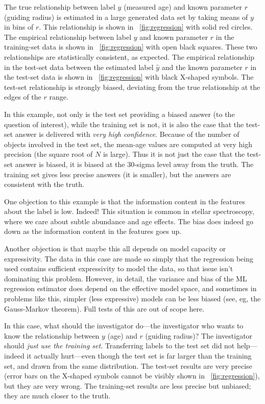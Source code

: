 \documentclass{article}
\newcommand{\figref}[1]{\figurename~\ref{#1}}
\begin{document}
The true relationship between label $y$ (measured age) and known parameter $r$ (guiding radius) is estimated in a large generated data set by taking means of $y$ in bins of $r$.
This relationship is shown in \figref{fig:regression} with solid red circles.
The empirical relationship between label $y$ and known parameter $r$ in the training-set data is shown in \figref{fig:regression} with open black squares.
These two relationships are statistically consistent, as expected.
The empirical relationship in the test-set data between the estimated label $\hat{y}$ and the known parameter $r$ in the test-set data is shown in \figref{fig:regression} with black X-shaped symbols.
The test-set relationship is strongly biased, deviating from the true relationship at the edges of the $r$ range.

In this example, not only is the test set providing a biased answer (to the question of interest), while the training set is not, it is also the case that the test-set answer is delivered with \emph{very high confidence}.
Because of the number of objects involved in the test set, the mean-age values are computed at very high precision (the square root of $N$ is large).
Thus it is not just the case that the test-set answer is biased, it is biased at the 30-sigma level away from the truth.
The training set gives less precise answers (it is smaller), but the answers are consistent with the truth.

One objection to this example is that the information content in the features about the label is low.
Indeed! This situation is common in stellar spectroscopy, where we care about subtle abundance and age effects.
The bias does indeed go down as the information content in the features goes up.

Another objection is that maybe this all depends on model capacity or expressivity.
The data in this case are made so simply that the regression being used contains sufficient expressivity to model the data, so that issue isn't dominating this problem.
However, in detail, the variance and bias of the ML regression estimator does depend on the effective model space, and sometimes in problems like this, simpler (less expressive) models can be less biased (see, eg, the Gauss-Markov theorem).
Full tests of this are out of scope here.

In this case, what should the investigator do---the investigator who wants to know the relationship between $y$ (age) and $r$ (guiding radius)?
The investigator should \emph{just use the training set}.
Transferring labels to the test set did not help---indeed it actually hurt---even though the test set is far larger than the training set, and drawn from the same distribution.
The test-set results are very precise (error bars on the X-shaped symbols cannot be visibly shown in \figref{fig:regression}), but they are very wrong.
The training-set results are less precise but unbiased; they are much closer to the truth.
\end{document}
